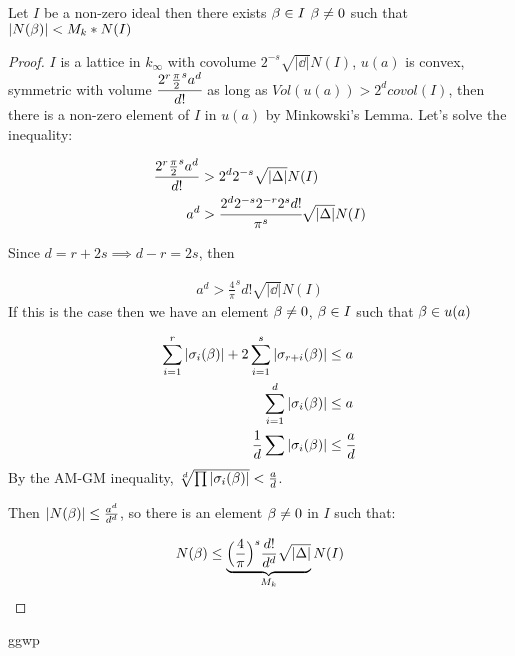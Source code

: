 \documentclass[11pt]{article}
\begin{document}
\begin{lemma}
	Let $I$ be a non-zero ideal then there exists $\beta \in I$ $\beta \neq 0 $ such that $|N(\beta)| <M_k * N(I) $
\end{lemma}
\begin{proof}
	$I$ is a lattice in $k_\infty$ with covolume $2^{-s} \sqrt{|\dd|} N(I)$, $u(a)$ is convex, symmetric with volume $\cfrac{2^r \frac{\pi}{2}^s a^d}{d!}$ as long as $Vol(u(a)) > 2^d covol(I)$, then there is a non-zero element of $I$ in $u(a)$ by Minkowski's Lemma.
	Let's solve the inequality:

	\begin{align*}
		\frac{2^r \frac{\pi}{2}^s a^d}{d!} &> 2^d 2^{-s} \sqrt{|\Delta|} N(I)\\
		a^d &> \cfrac{2^d 2^{-s} 2^{-r} 2^{s} d!}{\pi^s} \sqrt{|\Delta|} N(I)
	\end{align*}

	Since $d = r+ 2s \implies d -r =2s$, then

	\begin{align*}
		a^d > \frac{4}{\pi}^s d! \sqrt{|\dd|} N(I)
	\end{align*}
	If this is the case then we have an element $\beta \neq 0$, $\beta \in I$ such that $\beta \in u(a)$



	\begin{align*}
		\sum_{i=1}^r |\sigma_i(\beta) | + 2 \sum_{i=1}^s |\sigma_{r+i}(\beta)| &\leq a\\
		\sum_{i=1}^d |\sigma_i(\beta)|& \leq a\\
		\frac{1}{d} \sum |\sigma_i(\beta)| &\leq \frac{a}{d} 
	\end{align*}
	By the AM-GM inequality, $\sqrt[d]{\prod |\sigma_i(\beta)|} < \frac{a}{d}$.

	Then $|N(\beta)| \leq \frac{a^d}{d^d}$, so there is an element $\beta \neq 0 $ in $I$ such that:

	\begin{align*}
		N(\beta) \leq \underbrace{\Big(\frac{4}{\pi}\Big)^s \frac{d!}{d^d} \sqrt{|\Delta|} }_{M_k}N(I) 
	\end{align*}
\end{proof}


\newpage
\center ggwp







 
\end{document}
